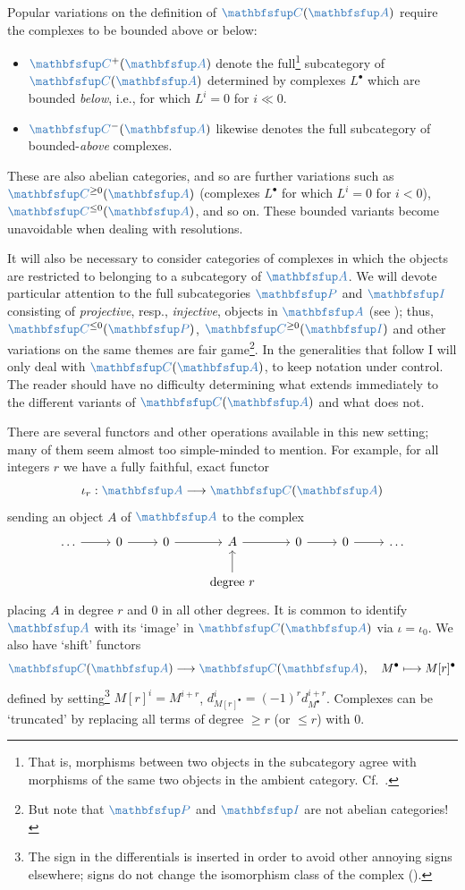 Popular variations on the definition of $\categ{C}(\categ{A})$ require
the complexes to be bounded above or below:
\begin{itemize}
\item $\categ{C}^+(\categ{A})$ denote the full\footnote{That is,
    morphisms between two objects in the subcategory agree with
    morphisms of the same two objects in the ambient category. Cf.\
    .} subcategory of $\categ{C}(\categ{A})$
  determined by complexes $L^\bullet$ which are bounded \emph{below},
  i.e., for which $L^i = 0$ for $i \ll 0$.
\item $\categ{C}^-(\categ{A})$ likewise denotes the full subcategory
  of bounded-\emph{above} complexes.
\end{itemize}
These are also abelian categories, and so are further variations such
as $\categ{C}^{\geq 0}(\categ{A})$ (complexes $L^\bullet$ for which
$L^i = 0$ for $i < 0$), $\categ{C}^{\leq 0}(\categ{A})$, and so on.
These bounded variants become unavoidable when dealing with
resolutions.

It will also be necessary to consider categories of complexes in which
the objects are restricted to belonging to a subcategory of
$\categ{A}$. We will devote particular attention to the full
subcategories $\categ{P}$ and $\categ{I}$ consisting of
\emph{projective}, resp., \emph{injective}, objects in $\categ{A}$
(see
);
thus, $\categ{C}^{\leq 0}(\categ{P})$, $\categ{C}^{\geq 0}(\categ{I})$
and other variations on the same themes are fair game\footnote{But
  note that $\categ{P}$ and $\categ{I}$ are not abelian
  categories!}. In the generalities that follow I will only deal with
$\categ{C}(\categ{A})$, to keep notation under control. The reader
should have no difficulty determining what extends immediately to the
different variants of $\categ{C}(\categ{A})$ and what does not.

There are several functors and other operations available in this new
setting; many of them seem almost too simple-minded to mention.  For
example, for all integers $r$ we have a fully faithful, exact functor
\[
  \iota_r : \categ{A} \longrightarrow \categ{C}(\categ{A})
\]
sending an object $A$ of $\categ{A}$ to the complex
\[\begin{tikzcd}
    \dots \arrow[r] & 0 \arrow[r] & 0 \arrow[r] & A \arrow[r] & 0
    \arrow[r] & 0 \arrow[r] & \dots \\
    &&& \text{degree } r \arrow[u]
  \end{tikzcd}\] placing $A$ in degree $r$ and $0$ in all other
degrees. It is common to identify $\categ{A}$ with its `image' in
$\categ{C}(\categ{A})$ via $\iota = \iota_0$. We also have `shift'
functors
\[
  \categ{C}(\categ{A}) \longrightarrow \categ{C}(\categ{A}), \quad
  M^\bullet \longmapsto M[r]^\bullet
\]
defined by setting\footnote{The sign in the differentials is inserted
  in order to avoid other annoying signs elsewhere; signs do not
  change the isomorphism class of the complex
  ().}
$M[r]^i = M^{i+r}$, $d^i_{M[r]^\bullet} = (-1)^r d^{i+r}_{M^\bullet}$.
Complexes can be `truncated' by replacing all terms of degree $\geq r$
(or $\leq r$) with $0$.

